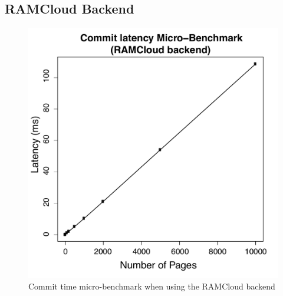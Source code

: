 \subsection{RAMCloud Backend}
\begin{figure}[t!]
\begin{center}
\includegraphics[scale=0.40]{graphs/commit_time_rc_latencies.pdf}
\end{center}
\caption{Commit time micro-benchmark when using the RAMCloud backend}
\label{fig:rc-commit-ubm}
\end{figure}

